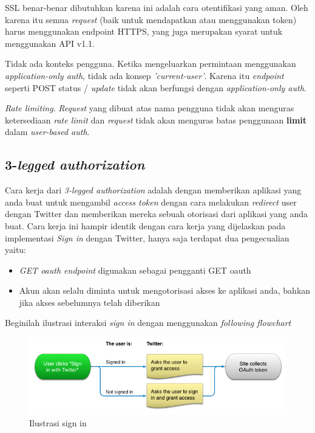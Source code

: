 SSL benar-benar dibutuhkan karena ini adalah cara otentifikasi yang aman. Oleh karena itu semua \textit{request} (baik untuk mendapatkan atau menggunakan token) harus menggunakan endpoint HTTPS, yang juga merupakan syarat untuk menggunakan API v1.1.

Tidak ada konteks pengguna. Ketika mengeluarkan permintaan menggunakan \textit{application-only auth}, tidak ada konsep \textit{'current-user'}. Karena itu \textit{endpoint} seperti POST status / \textit{update} tidak akan berfungsi dengan \textit{application-only auth}.

\textit{Rate limiting}. \textit{Request} yang dibuat atas nama pengguna tidak akan menguras ketersediaan \textit{rate limit} dan \textit{request} tidak akan menguras batas penggunaan \textbf{limit} dalam \textit{user-based auth}.


\subsection{3-\textit{legged authorization}}
Cara kerja dari \textit{3-legged authorization} adalah dengan memberikan aplikasi yang anda buat untuk mengambil \textit{access token} dengan cara melakukan \textit{redirect} user dengan Twitter dan memberikan mereka sebuah otorisasi dari aplikasi yang anda buat. Cara kerja ini hampir identik dengan cara kerja yang dijelaskan pada implementasi \textit{Sign in} dengan Twitter, hanya saja terdapat dua pengecualian yaitu:

\begin{itemize}
	\item \textit{GET oauth endpoint} digunakan sebagai pengganti GET oauth
	\item Akun akan selalu diminta untuk mengotorisasi akses ke aplikasi anda, bahkan jika akses sebelumnya telah diberikan
\end{itemize}

Beginilah ilustrasi interaksi \textit{sign in} dengan menggunakan \textit{following flowchart}

\begin{figure}[H]
	\centering
		\includegraphics[width=1.00\textwidth]{Gambar/sign-in-flow3-3legged.png}
	\caption{Ilustrasi sign in}
	\label{fig:sign-in-flow3-3legged}
\end{figure}

